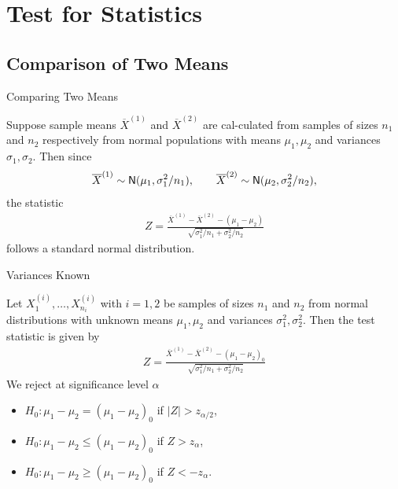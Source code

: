 \section{Test for Statistics}

\subsection{Comparison of Two Means}

\begin{frame}{Comparing Two Means}

\justifying
{} Suppose sample means $\overline{X}^{(1)}$ and $\overline{X}^{(2)}$ are cal-culated from samples of sizes $n_1$ and $n_2$ respectively from normal populations with means $\mu_1, \mu_2$ and variances $\sigma_1, \sigma_2$. Then since
\begin{align*}
\overline{X}^{(1)}\sim \mathsf{N}(\mu_1, \sigma_1^2/n_1), \qquad \overline{X}^{(2)} \sim \mathsf{N}(\mu_2, \sigma_2^2/n_2),
\end{align*}
the statistic
\begin{align*}
Z = \frac{\overline{X}^{(1)} - \overline{X}^{(2)} - (\mu_1 - \mu_2)}{\sqrt{\sigma_1^2/n_1 + \sigma_2^2/n_2}}
\end{align*}
follows a standard normal distribution.

\end{frame}


\begin{frame}{Variances Known}

\justifying
{} Let $X_1^{(i)}, \ldots, X_{n_i}^{(i)}$ with $i = 1, 2$ be samples of sizes $n_1$ and $n_2$ from normal distributions with unknown means $\mu_1, \mu_2$ and  variances $\sigma_1^2, \sigma_2^2$. Then the test statistic is given by
\begin{align*}
Z = \frac{\overline{X}^{(1)} - \overline{X}^{(2)} - (\mu_1 - \mu_2)_0}{\sqrt{\sigma_1^2/n_1 + \sigma_2^2/n_2}}
\end{align*}
We reject at significance level $\alpha$
\begin{itemize}
	\item $H_0: \mu_1 - \mu_2 = (\mu_1-\mu_2)_0$ if $|Z| > z_{\alpha/2}$,
	\item $H_0: \mu_1 - \mu_2 \leq (\mu_1-\mu_2)_0$ if $Z > z_{\alpha}$,
	\item $H_0: \mu_1 - \mu_2 \geq (\mu_1-\mu_2)_0$ if $Z < -z_{\alpha}$.
\end{itemize}

\end{frame}


